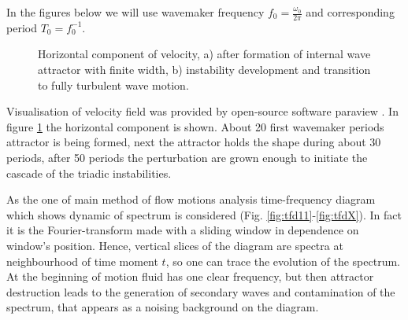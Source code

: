 \documentclass[a4wide,fontsize=12pt]{article}
\begin{document}
In the figures below we will use wavemaker frequency $\displaystyle f_0=\frac{\omega_0}{2\pi}$ and corresponding period $T_0=f_0^{-1}$. 




\begin{figure}[h!]
\centering
    \begin{minipage}[t]{0.45\textwidth}
        \centering
        \label{fig:LamAttr}
    \end{minipage}
    \begin{minipage}[t]{0.45\textwidth}
        \centering
        \label{fig:turbAttr}
    \end{minipage}
    \caption{Horizontal component of velocity, a) after formation of internal wave attractor with finite width, b) instability development and transition to fully turbulent wave motion.}
    \label{fig:2dAttr}
\end{figure}

Visualisation of velocity field was provided by open-source software paraview  \cite{paraview}. In figure \ref{fig:2dAttr} the horizontal component is shown. 
About 20 first wavemaker periods attractor is being formed, next the attractor holds the shape during about 30 periods, after 50 periods the perturbation are grown enough to initiate the cascade of the triadic instabilities. 
 
As the one of main method of flow motions analysis time-frequency diagram which shows dynamic of spectrum is considered (Fig. \ref{fig:tfd11}-\ref{fig:tfdX}). In fact it is the Fourier-transform made with a sliding window in dependence on window's position. Hence, vertical slices of the diagram are spectra at neighbourhood of time moment $t$, so one can trace the evolution of the spectrum. At the beginning of motion fluid has one clear frequency, but then attractor destruction leads to the generation of secondary waves and contamination of the spectrum, that appears as a noising background on the diagram. 
\end{document}
